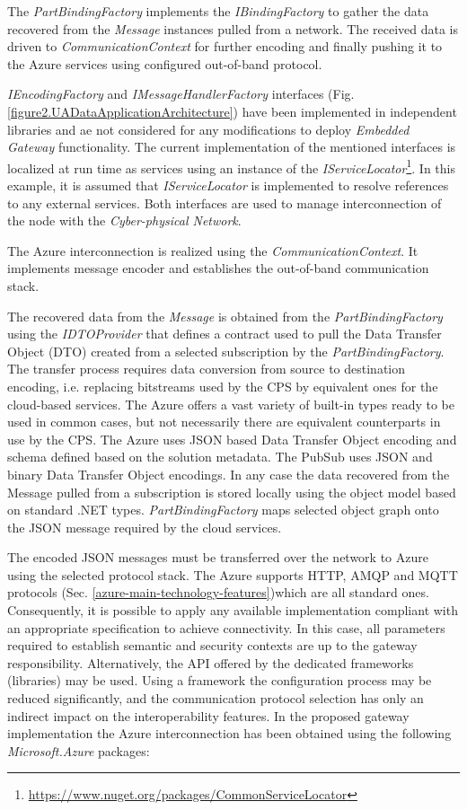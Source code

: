 \documentclass{article}
\begin{document}
The \textit{PartBindingFactory} implements the \textit{IBindingFactory} to gather the data recovered from the \emph{Message} instances pulled from a network. The received data is driven to \textit{CommunicationContext} for further encoding and finally pushing it to the Azure services using configured out-of-band protocol.

\textit{IEncodingFactory} and \textit{IMessageHandlerFactory} interfaces (Fig. \ref*{figure2.UADataApplicationArchitecture}) have been implemented in independent libraries and ae not considered for any modifications to deploy \textit{Embedded Gateway} functionality. The current implementation of the mentioned interfaces is localized at run time as services using an instance of the \textit{IServiceLocator}\footnote{ \url{https://www.nuget.org/packages/CommonServiceLocator} }. In this example, it is assumed that \textit{IServiceLocator} is implemented to resolve references to any external services. Both interfaces are used to manage interconnection of the node with the \textit{Cyber-physical Network}.

The Azure interconnection is realized using the \textit{CommunicationContext}. It implements message encoder and establishes the out-of-band communication stack.

The recovered data from the \textit{Message} is obtained from the \textit{PartBindingFactory} using the \textit{IDTOProvider} that defines a contract used to pull the Data Transfer Object (DTO) created from a selected subscription by the \textit{PartBindingFactory}. The transfer process requires data conversion from source to destination encoding, i.e. replacing bitstreams used by the CPS by equivalent ones for the cloud-based services. The Azure offers a vast variety of built-in types ready to be used in common cases, but not necessarily there are equivalent counterparts in use by the CPS. The Azure uses JSON based Data Transfer Object encoding and schema defined based on the solution metadata. The PubSub uses JSON and binary Data Transfer Object encodings. In any case the data recovered from the Message pulled from a subscription is stored locally using the object model based on standard .NET types. \textit{PartBindingFactory} maps selected object graph onto the JSON message required by the cloud services.

The encoded JSON messages must be transferred over the network to Azure using the selected protocol stack. The Azure supports HTTP, AMQP and MQTT protocols (Sec. \ref*{azure-main-technology-features})which are all standard ones. Consequently, it is possible to apply any available implementation compliant with an appropriate specification to achieve connectivity. In this case, all parameters required to establish semantic and security contexts are up to the gateway responsibility. Alternatively, the API offered by the dedicated frameworks (libraries) may be used. Using a framework the configuration process may be reduced significantly, and the communication protocol selection has only an indirect impact on the interoperability features. In the proposed gateway implementation the Azure interconnection has been obtained using the following \textit{Microsoft.Azure} packages:
\end{document}
